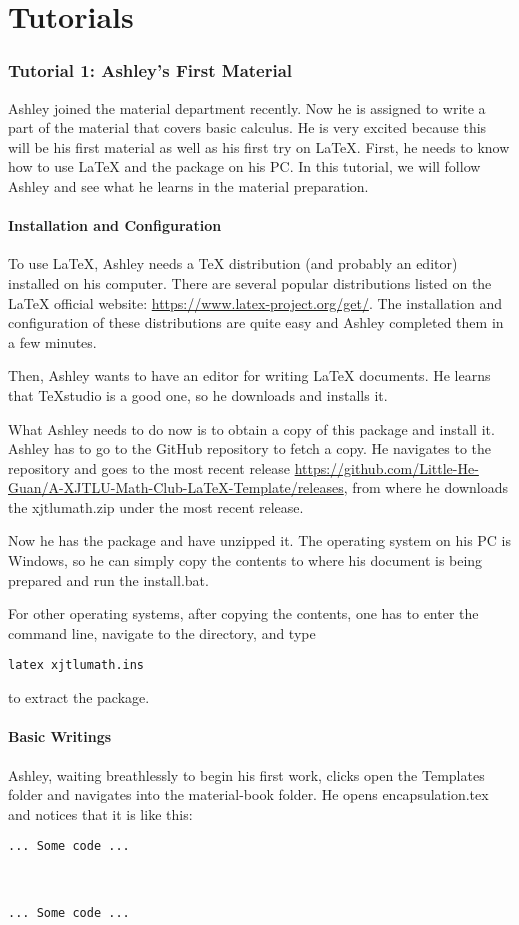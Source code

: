 \part{Tutorials}
\section{Tutorial 1: Ashley's First Material}
Ashley joined the material department recently. Now he is assigned to write a part of the material that covers basic calculus. He is very excited because this will be his first material as well as his first try on \LaTeX. First, he needs to know how to use \LaTeX{} and the package on his PC. In this tutorial, we will follow Ashley and see what he learns in the material preparation.

\subsection{Installation and Configuration}
To use \LaTeX{}, Ashley needs a \TeX{} distribution (and probably an editor) installed on his computer. There are several popular distributions listed on the \LaTeX{} official website: \url{https://www.latex-project.org/get/}. The installation and configuration of these distributions are quite easy and Ashley completed them in a few minutes.

Then, Ashley wants to have an editor for writing \LaTeX{} documents. He learns that \TeX studio is a good one, so he downloads and installs it.

What Ashley needs to do now is to obtain a copy of this package and install it. Ashley has to go to the GitHub repository \gitrepo{} to fetch a copy. He navigates to the repository and goes to the most recent release \url{https://github.com/Little-He-Guan/A-XJTLU-Math-Club-LaTeX-Template/releases}, from where he downloads the xjtlumath.zip under the most recent release.

Now he has the package and have unzipped it. The operating system on his PC is Windows, so he can simply copy the contents to where his document is being prepared and run the install.bat.

For other operating systems, after copying the contents, one has to enter the command line, navigate to the directory, and type
\begin{verbatim}
latex xjtlumath.ins
\end{verbatim}
to extract the package.

\subsection{Basic Writings}
Ashley, waiting breathlessly to begin his first work, clicks open the Templates folder and navigates into the material-book folder. He opens encapsulation.tex and notices that it is like this:
\begin{lstlisting}
... Some code ...



... Some code ...
\end{lstlisting}

